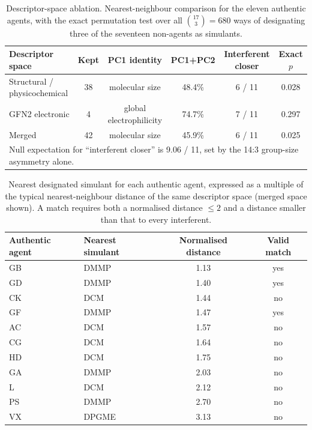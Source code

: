 \begin{table}[t]
\centering
\caption{Descriptor-space ablation. Nearest-neighbour comparison for the eleven
authentic agents, with the exact permutation test over all $\binom{17}{3}=680$ ways
of designating three of the seventeen non-agents as simulants.}
\label{tab:ablation}
\begin{tabular}{lccccc}
\hline
Descriptor space & Kept & PC1 identity & PC1+PC2 & Interferent closer & Exact $p$ \\
\hline
Structural / physicochemical & 38 & molecular size & 48.4\% & 6 / 11 & 0.028 \\
GFN2 electronic & 4 & global electrophilicity & 74.7\% & 7 / 11 & 0.297 \\
Merged & 42 & molecular size & 45.9\% & 6 / 11 & 0.025 \\
\hline
\multicolumn{6}{l}{\footnotesize Null expectation for ``interferent closer'' is
9.06 / 11, set by the 14:3 group-size asymmetry alone.}\\
\end{tabular}
\end{table}

\begin{table}[t]
\centering
\caption{Nearest designated simulant for each authentic agent, expressed as a
multiple of the typical nearest-neighbour distance of the same descriptor space
(merged space shown). A match requires both a normalised distance $\le 2$ and a
distance smaller than that to every interferent.}
\label{tab:match}
\begin{tabular}{llcc}
\hline
Authentic agent & Nearest simulant & Normalised distance & Valid match \\
\hline
GB & DMMP & 1.13 & yes \\
GD & DMMP & 1.40 & yes \\
CK & DCM & 1.44 & no \\
GF & DMMP & 1.47 & yes \\
AC & DCM & 1.57 & no \\
CG & DCM & 1.64 & no \\
HD & DCM & 1.75 & no \\
GA & DMMP & 2.03 & no \\
L & DCM & 2.12 & no \\
PS & DMMP & 2.70 & no \\
VX & DPGME & 3.13 & no \\
\hline
\end{tabular}
\end{table}

